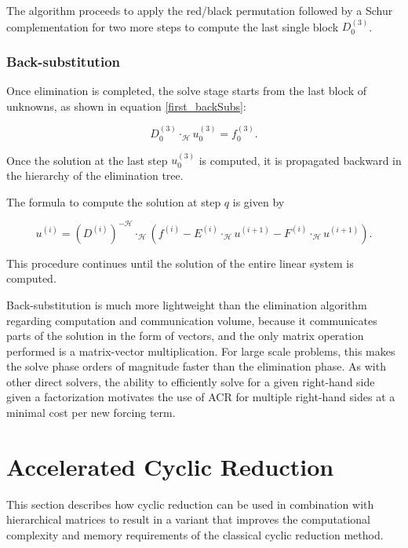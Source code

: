 \documentclass[]{elsarticle}
\begin{document}
The algorithm proceeds to apply the red/black permutation followed by a Schur complementation for two more steps to compute the last single block $D_0^{(3)}$. 

\subsubsection{Back-substitution}

Once elimination is completed, the solve stage starts from the last block of unknowns, as shown in equation \ref{first_backSubs}:

\begin{equation}
D_0^{(3)} \cdot_{\mathcal{H}} u_0^{(3)} = f_0^{(3)}.
\label{first_backSubs}
\end{equation}

Once the solution at the last step $u_0^{(3)}$ is computed, it is propagated backward in the hierarchy of the elimination tree.

The formula to compute the solution at step $q$ is given by

\begin{equation}
u^{(i)} = (D^{(i)})^{-\mathcal{H}} \cdot_{\mathcal{H}} ( f^{(i)} - E^{(i)} \cdot_{\mathcal{H}} u^{(i+1)} -  F^{(i)} \cdot_{\mathcal{H}} u^{(i+1)}).
\label{all_backSubs}
\end{equation}

This procedure continues until the solution of the entire linear system is computed.

Back-substitution is much more lightweight than the elimination algorithm regarding computation and communication volume, because it communicates parts of the solution in the form of vectors, and the only matrix operation performed is a matrix-vector multiplication. For large scale problems, this makes the solve phase orders of magnitude faster than the elimination phase. As with other direct solvers, the ability to efficiently solve for a given right-hand side given a factorization motivates the use of ACR for multiple right-hand sides at a minimal cost per new forcing term.

\section{Accelerated Cyclic Reduction}

This section describes how cyclic reduction can be used in combination with hierarchical matrices to result in a variant that improves the computational complexity and memory requirements of the classical cyclic reduction method.
\end{document}
